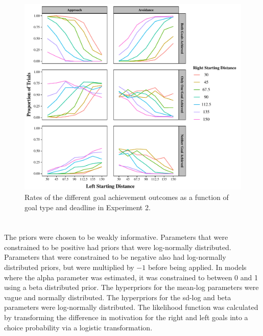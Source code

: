 \documentclass[a4paper,doc,natbib,donotrepeattitle]{apa6}
\begin{document}
\clearpage
\section{}
\begin{figure}[h!]
\centering
\includegraphics[width=1\textwidth]{GoalAchievement-Distance.pdf}
\caption{\label{fig:GoalAch-Deadline} Rates of the different goal achievement outcomes as a function of goal type and deadline in Experiment 2.}
\end{figure}

\clearpage
\section{}


The priors were chosen to be weakly informative. Parameters that were constrained to be positive had priors that were log-normally distributed. Parameters that were constrained to be negative also had log-normally distributed priors, but were multiplied by $-1$ before being applied. In models where the alpha parameter was estimated, it was constrained to between 0 and 1 using a beta distributed prior. The hyperpriors for the mean-log parameters were vague and normally distributed. The hyperpriors for the sd-log and beta parameters were log-normally distributed. The likelihood function was calculated by transforming the difference in motivation for the right and left goals into a choice probability via a logistic transformation.
\end{document}
